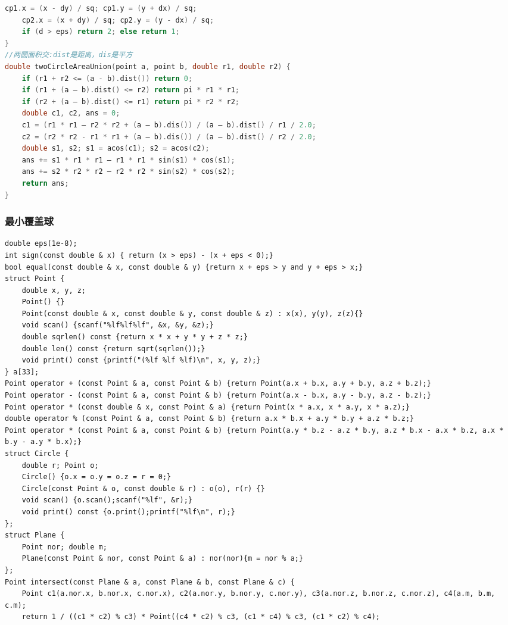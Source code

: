 \documentclass[landscape,a4paper]{article}
\begin{document}
\begin{spacing}{0.3}
\begin{multicols}{3}
\begin{lstlisting}[language=C++]
	cp1.x = (x - dy) / sq; cp1.y = (y + dx) / sq;
	cp2.x = (x + dy) / sq; cp2.y = (y - dx) / sq;
	if (d > eps) return 2; else return 1;
}
//两圆面积交:dist是距离，dis是平方
double twoCircleAreaUnion(point a, point b, double r1, double r2) {
	if (r1 + r2 <= (a - b).dist()) return 0;
	if (r1 + (a – b).dist() <= r2) return pi * r1 * r1;
	if (r2 + (a – b).dist() <= r1) return pi * r2 * r2;
	double c1, c2, ans = 0;
	c1 = (r1 * r1 – r2 * r2 + (a – b).dis()) / (a – b).dist() / r1 / 2.0;
	c2 = (r2 * r2 - r1 * r1 + (a – b).dis()) / (a – b).dist() / r2 / 2.0;
	double s1, s2; s1 = acos(c1); s2 = acos(c2);
	ans += s1 * r1 * r1 – r1 * r1 * sin(s1) * cos(s1);
	ans += s2 * r2 * r2 – r2 * r2 * sin(s2) * cos(s2);
	return ans;
}
\end{lstlisting}
\subsubsection{最小覆盖球}
\begin{lstlisting}
double eps(1e-8);
int sign(const double & x) { return (x > eps) - (x + eps < 0);}
bool equal(const double & x, const double & y) {return x + eps > y and y + eps > x;}
struct Point {
	double x, y, z;
	Point() {}
	Point(const double & x, const double & y, const double & z) : x(x), y(y), z(z){}
	void scan() {scanf("%lf%lf%lf", &x, &y, &z);}
	double sqrlen() const {return x * x + y * y + z * z;}
	double len() const {return sqrt(sqrlen());}
	void print() const {printf("(%lf %lf %lf)\n", x, y, z);}
} a[33];
Point operator + (const Point & a, const Point & b) {return Point(a.x + b.x, a.y + b.y, a.z + b.z);}
Point operator - (const Point & a, const Point & b) {return Point(a.x - b.x, a.y - b.y, a.z - b.z);}
Point operator * (const double & x, const Point & a) {return Point(x * a.x, x * a.y, x * a.z);}
double operator % (const Point & a, const Point & b) {return a.x * b.x + a.y * b.y + a.z * b.z;}
Point operator * (const Point & a, const Point & b) {return Point(a.y * b.z - a.z * b.y, a.z * b.x - a.x * b.z, a.x * b.y - a.y * b.x);}
struct Circle {
	double r; Point o;
	Circle() {o.x = o.y = o.z = r = 0;}
	Circle(const Point & o, const double & r) : o(o), r(r) {}
	void scan() {o.scan();scanf("%lf", &r);}
	void print() const {o.print();printf("%lf\n", r);}
};
struct Plane {
	Point nor; double m;
	Plane(const Point & nor, const Point & a) : nor(nor){m = nor % a;}
};
Point intersect(const Plane & a, const Plane & b, const Plane & c) {
	Point c1(a.nor.x, b.nor.x, c.nor.x), c2(a.nor.y, b.nor.y, c.nor.y), c3(a.nor.z, b.nor.z, c.nor.z), c4(a.m, b.m, c.m);
	return 1 / ((c1 * c2) % c3) * Point((c4 * c2) % c3, (c1 * c4) % c3, (c1 * c2) % c4);

\end{lstlisting}
\end{multicols}
\end{spacing}
\end{document}
